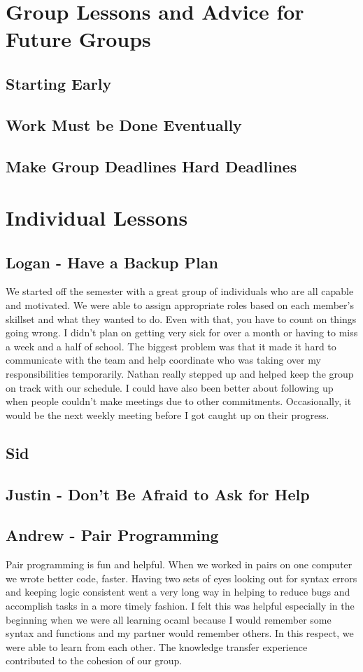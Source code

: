 \section{Group Lessons and Advice for Future Groups}
\subsection{Starting Early}
\subsection{Work Must be Done Eventually}
\subsection{Make Group Deadlines Hard Deadlines}
\section{Individual Lessons}
\subsection{Logan - Have a Backup Plan}
We started off the semester with a great group of individuals who are all capable and motivated. We were able to assign appropriate roles based on each member's skillset and what they wanted to do. Even with that, you have to count on things going wrong. I didn’t plan on getting very sick for over a month or having to miss a week and a half of school. The biggest problem was that it made it hard to communicate with the team and help coordinate who was taking over my responsibilities temporarily. Nathan really stepped up and helped keep the group on track with our schedule. I could have also been better about following up when people couldn’t make meetings due to other commitments. Occasionally, it would be the next weekly meeting before I got caught up on their progress. 

\subsection{Sid}
\subsection{Justin - Don't Be Afraid to Ask for Help}

\subsection{Andrew - Pair Programming}
Pair programming is fun and helpful. When we worked in pairs on one computer we wrote better code, faster. Having two sets of eyes looking out for syntax errors and keeping logic consistent went a very long way in helping to reduce bugs and accomplish tasks in a more timely fashion. I felt this was helpful especially in the beginning when we were all learning ocaml because I would remember some syntax and functions and my partner would remember others. In this respect, we were able to learn from each other. The knowledge transfer experience contributed to the cohesion of our group.

